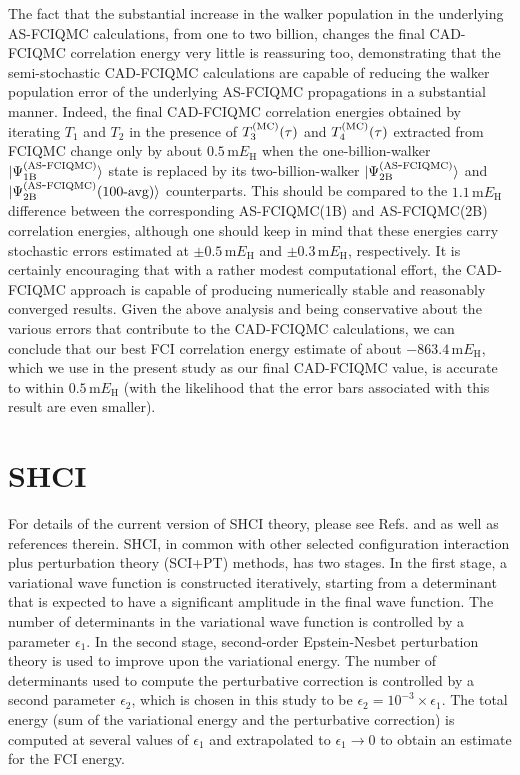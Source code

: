 \documentclass[journal=jcp,manuscript=suppinfo]{achemso}
\begin{document}
The fact that the substantial increase in the walker population in the
underlying AS-FCIQMC calculations, from one to two billion, changes the final
CAD-FCIQMC correlation energy very little is reassuring too, demonstrating that
the semi-stochastic CAD-FCIQMC calculations are capable of reducing the walker population
error of the underlying AS-FCIQMC propagations in a substantial manner. Indeed,
the final CAD-FCIQMC correlation energies obtained by iterating $T_{1}$ and $T_{2}$
in the presence of $T_{3}^{\rm (MC)}(\tau)$ and $T_{4}^{\rm (MC)}(\tau)$ extracted from FCIQMC
change only by about $0.5 \, \text{m}E_{\text{H}}$ when the one-billion-walker
$|\Psi_{\rm 1B}^{\rm (AS\mbox{-}FCIQMC)}\rangle$ state is replaced by its
two-billion-walker $|\Psi_{\rm 2B}^{\rm (AS\mbox{-}FCIQMC)}\rangle$ and
$|\Psi_{\rm 2B}^{\rm (AS\mbox{-}FCIQMC)}\mbox{(100-avg)}\rangle$ counterparts.
This should be compared to the $1.1 \, \text{m}E_{\text{H}}$ difference between
the corresponding AS-FCIQMC(1B) and AS-FCIQMC(2B) correlation energies, although
one should keep in mind that these energies carry stochastic errors estimated at
$\pm 0.5 \, \text{m}E_{\text{H}}$ and $\pm 0.3 \, \text{m}E_{\text{H}}$, respectively.
It is certainly encouraging that with a rather modest computational effort, the
CAD-FCIQMC approach is capable of producing numerically stable and reasonably
converged results. Given the above analysis and being conservative about the
various errors that contribute to the CAD-FCIQMC calculations, we can conclude that our best
FCI correlation energy estimate of about $-863.4 \, \text{m}E_{\text{H}}$,
which we use in the present study as our final CAD-FCIQMC value, is accurate
to within $0.5 \, \text{m}E_{\text{H}}$ (with the likelihood that the error
bars associated with this result are even smaller).


\section{SHCI}

For details of the current version of SHCI theory, please see Refs.  and  as well as references therein. SHCI, in common with other selected configuration interaction plus perturbation theory (SCI+PT) methods, has two stages. In the first stage, a variational wave function is constructed iteratively, starting from a determinant that is expected to have a significant amplitude in the final wave function. The number of determinants in the variational wave function is controlled by a parameter $\epsilon_1$. In the second stage, second-order Epstein-Nesbet perturbation theory is used to improve upon the variational energy. The number of determinants used to compute the perturbative correction is controlled by a second parameter $\epsilon_2$, which is chosen in this study to be $\epsilon_2 = 10^{-3} \times \epsilon_1$. The total energy (sum of the variational energy and the perturbative correction) is computed at several values of $\epsilon_1$ and extrapolated to $\epsilon_1 \to 0$ to obtain an estimate for the FCI energy.\\
\end{document}
